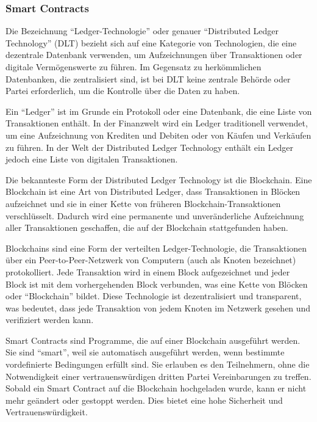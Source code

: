 \subsubsection{Smart Contracts}

Die Bezeichnung \enquote{Ledger-Technologie} oder genauer \enquote{Distributed Ledger Technology} (DLT) bezieht sich auf eine Kategorie von Technologien, die eine dezentrale Datenbank verwenden, um Aufzeichnungen über Transaktionen oder digitale Vermögenswerte zu führen. Im Gegensatz zu herkömmlichen Datenbanken, die zentralisiert sind, ist bei DLT keine zentrale Behörde oder Partei erforderlich, um die Kontrolle über die Daten zu haben.

Ein \enquote{Ledger} ist im Grunde ein Protokoll oder eine Datenbank, die eine Liste von Transaktionen enthält. In der Finanzwelt wird ein Ledger traditionell verwendet, um eine Aufzeichnung von Krediten und Debiten oder von Käufen und Verkäufen zu führen. In der Welt der Distributed Ledger Technology enthält ein Ledger jedoch eine Liste von digitalen Transaktionen.

Die bekannteste Form der Distributed Ledger Technology ist die Blockchain. Eine Blockchain ist eine Art von Distributed Ledger, dass Transaktionen in Blöcken aufzeichnet und sie in einer Kette von früheren Blockchain-Transaktionen verschlüsselt. Dadurch wird eine permanente und unveränderliche Aufzeichnung aller Transaktionen geschaffen, die auf der Blockchain stattgefunden haben.

Blockchains sind eine Form der verteilten Ledger-Technologie, die Transaktionen über ein Peer-to-Peer-Netzwerk von Computern (auch als Knoten bezeichnet) protokolliert. Jede Transaktion wird in einem Block aufgezeichnet und jeder Block ist mit dem vorhergehenden Block verbunden, was eine Kette von Blöcken oder  \enquote{Blockchain} bildet. Diese Technologie ist dezentralisiert und transparent, was bedeutet, dass jede Transaktion von jedem Knoten im Netzwerk gesehen und verifiziert werden kann.

Smart Contracts sind Programme, die auf einer Blockchain ausgeführt werden. Sie sind \enquote{smart}, weil sie automatisch ausgeführt werden, wenn bestimmte vordefinierte Bedingungen erfüllt sind. Sie erlauben es den Teilnehmern, ohne die Notwendigkeit einer vertrauenswürdigen dritten Partei Vereinbarungen zu treffen. Sobald ein Smart Contract auf die Blockchain hochgeladen wurde, kann er nicht mehr geändert oder gestoppt werden. Dies bietet eine hohe Sicherheit und Vertrauenswürdigkeit.

